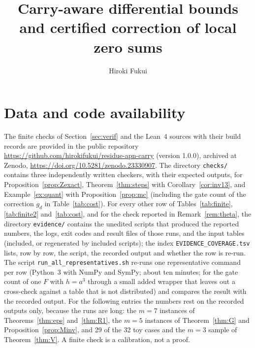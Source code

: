 \documentclass[11pt]{amsart}
\title[Carry-aware differential bounds and local zero sums]{Carry-aware differential bounds and certified correction of local zero sums}
\author{Hiroki Fukui}
\theoremstyle{definition}
\begin{document}
\begin{abstract}

\end{abstract}

\maketitle
\tableofcontents










\section*{Data and code availability}
The finite checks of Section~\ref{sec:verif} and the Lean~4 sources with their build records are provided in the public
repository \url{https://github.com/hirokifukui/residue-apn-carry} (version 1.0.0), archived at Zenodo,
\url{https://doi.org/10.5281/zenodo.23330907}.
The directory \texttt{checks/} contains three independently written checkers, with their expected outputs, for
Proposition~\ref{prop:Zexact}, Theorem~\ref{thm:steps} with Corollary~\ref{cor:inv13}, and Example~\ref{ex:quant} with
Proposition~\ref{prop:mc} (including the gate count of the correction $g_d$ in Table~\ref{tab:cost}). For every other row of
Tables~\ref{tab:finite}, \ref{tab:finite2} and~\ref{tab:cost}, and for the check reported in Remark~\ref{rem:theta}, the
directory \texttt{evidence/} contains the unedited scripts that produced the reported numbers, the logs, exit codes and result
files of those runs, and the input tables (included, or regenerated by included scripts); the index
\texttt{EVIDENCE\_COVERAGE.tsv} lists, row by row, the script, the recorded output and whether the row is re-run. The script
\texttt{run\_all\_representatives.sh} re-runs one representative command per row (Python~3 with NumPy and SymPy; about ten
minutes; for the gate count of one $F$ with $h=a^3$ through a small added wrapper that leaves out a cross-check against a
table that is not distributed) and compares the result with the recorded output. For the following entries the numbers rest on the recorded outputs
only, because the runs are long: the $m=7$ instances of Theorems~\ref{thm:eps} and~\ref{thm:R1}, the $m=5$ instances of
Theorem~\ref{thm:G} and Proposition~\ref{prop:Minv}, and 29 of the 32 toy cases and the $m=3$ sample of Theorem~\ref{thm:V}.
A finite check is a calibration, not a proof.
\end{document}
